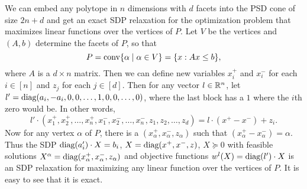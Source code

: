 \begin{example}
We can embed any polytope in $n$ dimensions with $d$ facets into the PSD cone of size $2n+d$ and get an exact SDP relaxation for the optimization problem that maximizes linear functions over the vertices of $P$. Let $V$ be the vertices and $(A,b)$ determine the facets of $P$, so that
\[P = \operatorname{conv}\{\alpha \mid \alpha \in V\} = \{x: Ax \leq b\},\]
where $A$ is a $d \times n$ matrix. Then we can define new variables $x_i^+$ and $x_i^-$ for each $i \in [n]$ and $z_j$ for each $j \in [d]$. Then for any vector $l \in \mathbb R^n$, let $l' = \text{diag}(a_i,-a_i,0,0,\dots,1,0,0,\dots,0)$, where the last block has a $1$ where the $i$th zero would be. In other words,
\[l' \cdot (x_1^+,x_2^+,\dots,x_n^+,x_1^-,x_2^-,\dots,x_n^-,z_1,z_2,\dots,z_d) = l \cdot (x^+ - x^-) + z_i.\]
Now for any vertex $\alpha$ of $P$, there is a $(x_\alpha^+,x_\alpha^-,z_\alpha)$ such that $(x_\alpha^+ - x_\alpha^-) = \alpha$. Thus the SDP $\text{diag}(a_i') \cdot X = b_i$, $X = \text{diag}(x^+,x^-,z)$, $X \succeq 0$ with feasible solutions $X^\alpha = \text{diag}(x_\alpha^+,x_\alpha^-,z_\alpha)$ and objective functions $w^l(X) = \text{diag}(l') \cdot X$ is an SDP relaxation for maximizing any linear function over the vertices of $P$. It is easy to see that it is exact.

\end{example}


